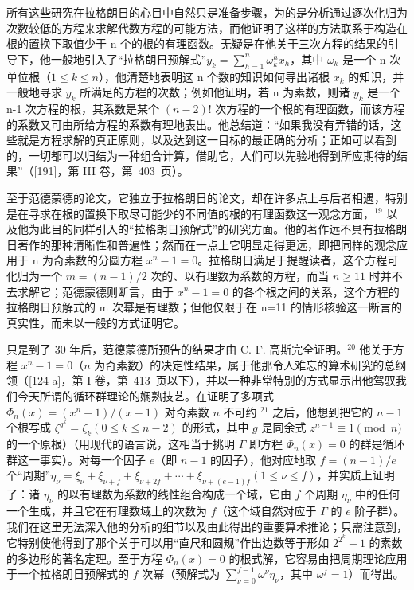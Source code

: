 所有这些研究在拉格朗日的心目中自然只是准备步骤，为的是分析通过逐次化归为次数较低的方程来求解代数方程的可能方法，而他证明了这样的方法联系于构造在根的置换下取值少于 n 个的根的有理函数。无疑是在他关于三次方程的结果的引导下，他一般地引入了“拉格朗日预解式”\(y_{k} = \sum_{h=1}^{n} \omega_{k}^{h} x_{h}\)，其中 \(\omega_{k}\) 是一个 n 次单位根（\(1 \leq k \leq n\)），他清楚地表明这 n 个数的知识如何导出诸根 \(x_{k}\) 的知识，并一般地寻求 \(y_{k}\) 所满足的方程的次数；例如他证明，若 n 为素数，则诸 \(y_{k}\) 是一个 n-1 次方程的根，其系数是某个 \((n-2)!\) 次方程的一个根的有理函数，而该方程的系数又可由所给方程的系数有理地表出。他总结道：“如果我没有弄错的话，这些就是方程求解的真正原则，以及达到这一目标的最正确的分析；正如可以看到的，一切都可以归结为一种组合计算，借助它，人们可以先验地得到所应期待的结果”（{[}191{]}，第 III 卷，第~403~页）。

至于范德蒙德的论文，它独立于拉格朗日的论文，却在许多点上与后者相遇，特别是在寻求在根的置换下取尽可能少的不同值的根的有理函数这一观念方面，\(^{19}\) 以及他为此目的同样引入的“拉格朗日预解式”的研究方面。他的著作远不具有拉格朗日著作的那种清晰性和普遍性；然而在一点上它明显走得更远，即把同样的观念应用于 n 为奇素数的分圆方程 \(x^{n}-1=0\)。拉格朗日满足于提醒读者，这个方程可化归为一个 \(m=(n-1)/2\) 次的、以有理数为系数的方程，而当 \(n\geq11\) 时并不去求解它；范德蒙德则断言，由于 \(x^{n}-1=0\) 的各个根之间的关系，这个方程的拉格朗日预解式的 m 次幂是有理数；但他仅限于在 n=11 的情形核验这一断言的真实性，而未以一般的方式证明它。

只是到了 30 年后，范德蒙德所预告的结果才由 C. F. 高斯完全证明。\(^{20}\) 他关于方程 \(x^n - 1 = 0\)（\(n\) 为奇素数）的决定性结果，属于他那令人难忘的算术研究的总纲领（{[}124 a{]}，第 I 卷，第~413~页以下），并以一种非常特别的方式显示出他驾驭我们今天所谓的循环群理论的娴熟技艺。在证明了多项式 \(\Phi_n(x) = (x^n - 1)/(x - 1)\) 对奇素数 \(n\) 不可约 \(^{21}\) 之后，他想到把它的 \(n - 1\) 个根写成 \(\zeta^{g^k} = \zeta_k (0 \leq k \leq n - 2)\) 的形式，其中 \(g\) 是同余式 \(z^{n-1} \equiv 1 \pmod{n}\) 的一个原根）（用现代的语言说，这相当于挑明 \(\Gamma\) 即方程 \(\Phi_n(x) = 0\) 的群是循环群这一事实）。对每一个因子 \(e\)（即 \(n-1\) 的因子），他对应地取 \(f = (n-1)/e\) 个“周期”\(\eta_\nu = \xi_\nu + \xi_{\nu+f} + \xi_{\nu+2f} + \cdots + \xi_{\nu+(e-1)f} (1 \leq \nu \leq f)\)，并实质上证明了：诸 \(\eta_{\nu}\) 的以有理数为系数的线性组合构成一个域，它由 \(f\) 个周期 \(\eta_{\nu}\) 中的任何一个生成，并且它在有理数域上的次数为 \(f\)（这个域自然对应于 \(\Gamma\) 的 \(e\) 阶子群）。我们在这里无法深入他的分析的细节以及由此得出的重要算术推论；只需注意到，它特别使他得到了那个关于可以用“直尺和圆规”作出边数等于形如 \(2^{2^k} + 1\) 的素数的多边形的著名定理。至于方程 \(\Phi_n(x) = 0\) 的根式解，它容易由把周期理论应用于一个拉格朗日预解式的 \(f\) 次幂（预解式为 \(\sum_{\nu=0}^{f-1} \omega^\nu \eta_\nu\)，其中 \(\omega^f = 1\)）而得出。

